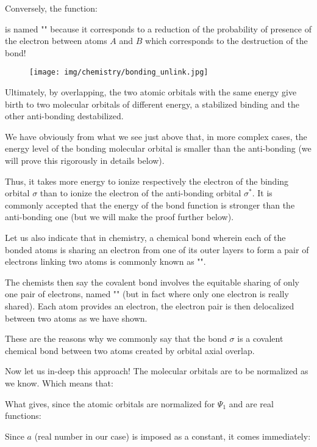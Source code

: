 	Conversely, the function:
	
	is named "" because it corresponds to a reduction of the probability of presence of the electron between atoms $A$ and $B$ which corresponds to the destruction of the bond!
	\begin{figure}[H]
		\begin{center}
		\texttt{[image: img/chemistry/bonding\_unlink.jpg]}
		\end{center}	
	\end{figure}
	
	Ultimately, by overlapping, the two atomic orbitals with the same energy give birth to two molecular orbitals of different energy, a stabilized binding and the other anti-bonding destabilized.

	We have obviously from what we see just above that, in more complex cases, the energy level of the bonding molecular orbital is smaller than the anti-bonding (we will prove this rigorously in details below).

	Thus, it takes more energy to ionize respectively the electron of the binding orbital $\sigma$ than to ionize the electron of the anti-bonding orbital $\sigma^{*}$. It is commonly accepted that the energy of the bond function is stronger than the anti-bonding one (but we will make the proof further below).

	Let us also indicate that in chemistry, a chemical bond wherein each of the bonded atoms is sharing an electron from one of its outer layers to form a pair of electrons linking two atoms is commonly known as "".
	
	The chemists then say the covalent bond involves the equitable sharing of only one pair of electrons, named "" (but in fact where only one electron is really shared). Each atom provides an electron, the electron pair is then delocalized between two atoms as we have shown.

	These are the reasons why we commonly say that the bond $\sigma$ is a covalent chemical bond between two atoms created by orbital axial overlap.

	Now let us in-deep this approach! The molecular orbitals are to be normalized as we know. Which means that:
	
		What gives, since the atomic orbitals are normalized for $\Psi_1$ and are real functions:
	
	Since $a$ (real number in our case) is imposed as a constant, it comes immediately:
	
